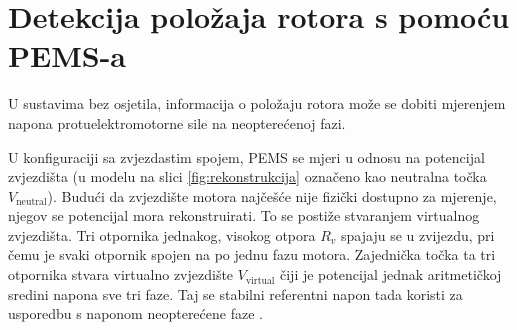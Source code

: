\documentclass[diplomskirad, upload]{fer}
\begin{document}
\section{Detekcija položaja rotora s pomoću PEMS-a}

U sustavima bez osjetila, informacija o položaju rotora može se dobiti
mjerenjem napona protuelektromotorne sile na neopterećenoj fazi.

U konfiguraciji sa zvjezdastim spojem, PEMS se mjeri u odnosu na potencijal
zvjezdišta (u modelu na slici \ref{fig:rekonstrukcija} označeno kao neutralna
točka $V_{\text{neutral}}$). Budući da zvjezdište motora najčešće nije fizički
dostupno za mjerenje, njegov se potencijal mora rekonstruirati. To se postiže
stvaranjem virtualnog zvjezdišta. Tri otpornika jednakog, visokog otpora $R_v$
spajaju se u zvijezdu, pri čemu je svaki otpornik spojen na po jednu fazu
motora. Zajednička točka ta tri otpornika stvara virtualno zvjezdište
$V_{\text{virtual}}$ čiji je potencijal jednak aritmetičkoj sredini napona sve
tri faze. Taj se stabilni referentni napon tada koristi za usporedbu s naponom
neopterećene faze \cite{ST_AN1946}.
\end{document}
